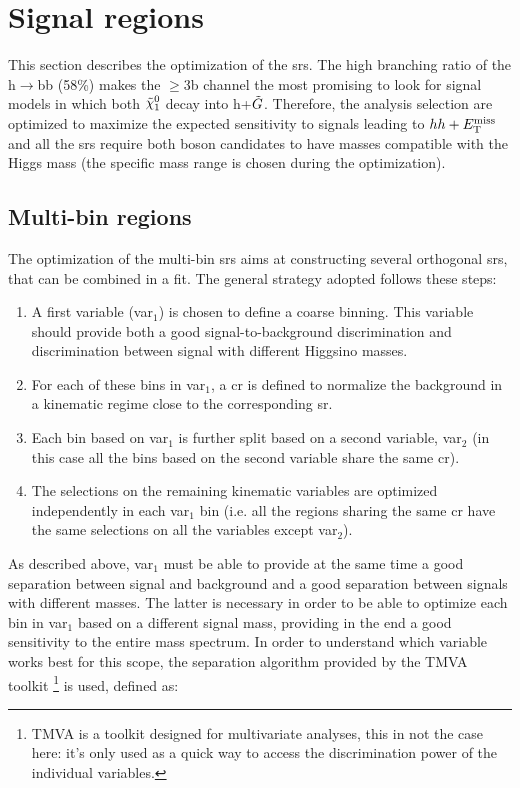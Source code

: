 \FloatBarrier

\section{Signal regions}

This section describes the optimization of the \glspl{sr}. 
The high branching ratio of the h$\rightarrow$bb (58\%) makes the $\geq$3b channel the most promising to look for signal models 
in which both $\ninoone$ decay into h+$\tilde{G}$. 
Therefore, the analysis selection are optimized to maximize the expected sensitivity to signals leading to $hh+E_{\rm T}^{\mathrm{miss}}$ 
and all the \glspl{sr} require both boson candidates to have masses compatible with the Higgs mass (the specific mass range is chosen during the optimization). 

\subsection{Multi-bin regions}
\label{sec:ewk:multibin}

The optimization of the multi-bin \glspl{sr} aims at constructing several orthogonal \glspl{sr}, that can be combined in a fit. 
The general strategy adopted follows these steps:
\begin{enumerate}
\item A first variable (var$_1$) is chosen to define a coarse binning. 
    This variable should provide both a good signal-to-background discrimination and discrimination between signal 
    with different Higgsino masses.
\item For each of these bins in var$_1$, a \gls{cr} is defined to normalize the \ttbar background in a kinematic regime close to the corresponding \gls{sr}.
\item Each bin based on var$_1$ is further split based on a second variable, var$_2$ (in this case all the bins based on the second variable share the same \gls{cr}).
\item The selections on the remaining kinematic variables are optimized independently in each var$_1$ bin (i.e. all the regions sharing the same 
\gls{cr} have the same selections on all the variables except var$_2$).
\end{enumerate}

\noindent As described above, var$_1$ must be able to provide at the same time a good separation between signal and background 
and a good separation between signals with different \hino masses. 
The latter is necessary in order to be able to optimize each bin in var$_1$ based on a different signal mass, 
providing in the end a good sensitivity to the entire mass spectrum. 
In order to understand which variable works best for this scope, the separation algorithm provided by the TMVA toolkit \footnote{TMVA is a toolkit designed for multivariate analyses, this in not the case here: it's only used as a quick way to access the discrimination power of the individual variables.} \cite{Hocker:2007ht} is used, defined as:

